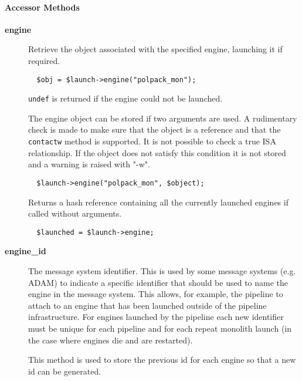 \paragraph*{Accessor Methods\label{ORAC::Msg::EngineLaunch_Accessor_Methods}}
\begin{description}

\item[{\textbf{engine}}] \mbox{}

Retrieve the object associated with the specified engine, launching
it if required.

\begin{verbatim}
  $obj = $launch->engine("polpack_mon");
\end{verbatim}


\texttt{undef} is returned if the engine could not be launched.



The engine object can be stored if two arguments are used.
A rudimentary check is made to make sure that the object
is a reference and that the \texttt{contactw} method is supported.
It is not possible to check a true ISA relationship. If the
object does not satisfy this condition it is not stored and
a warning is raised with "-w".

\begin{verbatim}
  $launch->engine("polpack_mon", $object);
\end{verbatim}


Returns a hash reference containing all the currently launched engines
if called without arguments.

\begin{verbatim}
  $launched = $launch->engine;
\end{verbatim}

\item[{\textbf{engine\_id}}] \mbox{}

The message system identifier. This is used by some message systems
(e.g. ADAM) to indicate a specific identifier that should be used
to name the engine in the message system. This allows, for example,
the pipeline to attach to an engine that has been launched
outside of the pipeline infrastructure. For engines launched
by the pipeline each new identifier must be unique for each pipeline
and for each repeat monolith launch (in the case where engines
die and are restarted).



This method is used to store the previous id for each engine so that
a new id can be generated.


\end{description}
